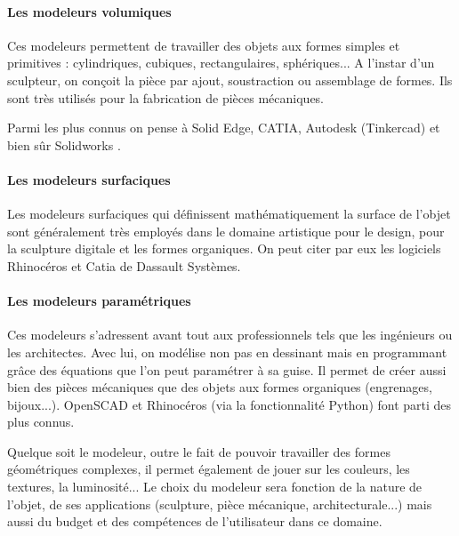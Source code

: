 \documentclass{article}
\begin{document}
\paragraph{Les modeleurs volumiques}\hfill\break
Ces modeleurs permettent de travailler des objets aux formes simples et primitives : cylindriques, cubiques, rectangulaires, sphériques... A l'instar d'un sculpteur, on conçoit la pièce par ajout, soustraction ou assemblage de formes. Ils sont très utilisés pour la fabrication de pièces mécaniques.

Parmi les plus connus on pense à Solid Edge, CATIA, Autodesk (Tinkercad) et bien sûr Solidworks .
\paragraph{Les modeleurs surfaciques}\hfill\break
Les modeleurs surfaciques qui définissent mathématiquement la surface de l'objet sont généralement très employés dans le domaine artistique pour le design, pour la sculpture digitale et les formes organiques. On peut citer par eux les logiciels Rhinocéros et Catia de Dassault Systèmes.
\paragraph{Les modeleurs paramétriques}\hfill\break
Ces modeleurs s'adressent avant tout aux professionnels tels que les ingénieurs ou les architectes. Avec lui, on modélise non pas en dessinant mais en programmant grâce des équations que l'on peut paramétrer à sa guise. Il permet de créer aussi bien des pièces mécaniques que des objets aux formes organiques (engrenages, bijoux...). OpenSCAD et Rhinocéros (via la fonctionnalité Python) font parti des plus connus.

Quelque soit le modeleur, outre le fait de pouvoir travailler des formes géométriques complexes, il permet également de jouer sur les couleurs, les textures, la luminosité... Le choix du modeleur sera fonction de la nature de l'objet, de ses applications (sculpture, pièce mécanique, architecturale...) mais aussi du budget et des compétences de l'utilisateur dans ce domaine.
\end{document}

